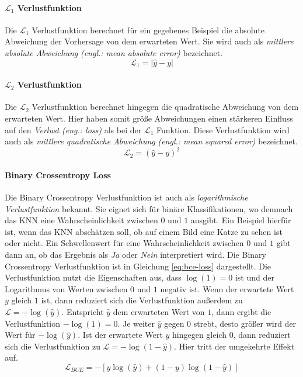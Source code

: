 \paragraph{$\mathcal{L}_1$ Verlustfunktion} Die $\mathcal{L}_1$ Verlustfunktion berechnet für ein gegebenes Beispiel die absolute Abweichung der Vorhersage von dem erwarteten Wert. Sie wird auch als \emph{mittlere absolute Abweichung} \emph{(engl.: mean absolute error)} bezeichnet.
\begin{equation}
   \mathcal{L}_1 = |\hat{y} - y|
\end{equation}

\paragraph{$\mathcal{L}_2$ Verlustfunktion} Die $\mathcal{L}_2$ Verlustfunktion berechnet hingegen die quadratische Abweichung von dem erwarteten Wert. Hier haben somit größe Abweichungen einen stärkeren Einfluss auf den \emph{Verlust} \emph{(eng.: loss)} als bei der $\mathcal{L}_1$ Funktion. Diese Verlustfunktion wird auch als \emph{mittlere quadratische Abweichung} \emph{(engl.: mean squared error)} bezeichnet.
\begin{equation}
   \mathcal{L}_2 = (\hat{y} - y)^2
\end{equation}

\paragraph{Binary Crossentropy Loss} Die Binary Crossentropy Verlustfunktion ist auch als \emph{logarithmische Verlustfunktion} bekannt. Sie eignet sich für binäre Klassifikationen, wo demnach das \ac{KNN} eine Wahrscheinlichkeit zwischen $0$ und $1$ ausgibt. Ein Beispiel hierfür ist, wenn das \ac{KNN} abschätzen soll, ob auf einem Bild eine Katze zu sehen ist oder nicht. Ein Schwellenwert für eine Wahrscheinlichkeit zwischen $0$ und $1$ gibt dann an, ob das Ergebnis als \emph{Ja} oder \emph{Nein} interpretiert wird. Die Binary Crossentropy Verlustfunktion ist in Gleichung \ref{eq:bce-loss} dargestellt. Die Verlustfunktion nutzt die Eigenschaften aus, dass $\log(1) = 0$ ist und der Logarithmus von Werten zwischen $0$ und $1$ negativ ist. Wenn der erwartete Wert $y$ gleich $1$ ist, dann reduziert sich die Verlustfunktion außerdem zu $\mathcal{L} = -\log(\hat{y})$. Entspricht $\hat{y}$ dem erwarteten Wert von $1$, dann ergibt die Verlustfunktion $-\log(1)=0$. Je weiter $\hat{y}$ gegen $0$ strebt, desto größer wird der Wert für $-\log(\hat{y})$. Ist der erwartete Wert $y$ hingegen gleich $0$, dann reduziert sich die Verlustfunktion zu $\mathcal{L} = -\log(1 - \hat{y})$. Hier tritt der umgekehrte Effekt auf. \cite{bce-loss}
\begin{equation}
	\label{eq:bce-loss}
   \mathcal{L}_{BCE} =  - [y \log(\hat{y}) + (1 - y) \log(1 - \hat{y})]
\end{equation}

